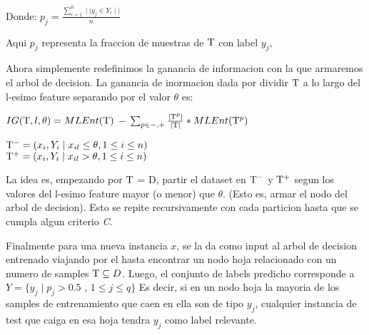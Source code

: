 \documentclass{article}
\begin{document}
            \begin{center}
                Donde: $p_j = \frac {\sum_{i=1}^{n} \mid \mid y_j \in Y_i \mid \mid} {n}$
            \end{center}
            
            Aqui $p_j$ representa la fraccion de muestras de $\mathrm{T}$ con label $y_j$,
            
            Ahora simplemente redefinimos la ganancia de informacion con la que armaremos el arbol de decision. La ganancia de inormacion dada por dividir $\mathrm{T}$ a lo largo del l-esimo feature separando por el valor $\theta$ es:
            
            \begin{center}
                $IG(\mathrm{T}, l, \theta) = MLEnt(\mathrm{T})$ $-$ $\sum_{p \in {-, +}} \frac{\mid \mathrm{T}^p \mid}{\mid \mathrm{T} \mid} * MLEnt(\mathrm{T}^p)$
            \end{center}
            \begin{center}
                $\mathrm{T}^- = {(x_i, Y_i \mid x_{il} \leq \theta, 1 \leq i \leq n)}$ \\
                $\mathrm{T}^+ = {(x_i, Y_i \mid x_{il} > \theta, 1 \leq i \leq n)}$
            \end{center}
        
            La idea es, empezando por $\mathrm{T}$ = D, partir el dataset en $\mathrm{T}^-$ y $\mathrm{T}^+$ segun los valores del l-esimo feature mayor (o menor) que $\theta$. (Esto es, armar el nodo del arbol de decision). Esto se repite recursivamente con cada particion hasta que se cumpla algun criterio \textit{C}.
            
            
            Finalmente para una nueva instancia $x$, se la da como input al arbol de decision entrenado viajando por el hasta encontrar un nodo hoja relacionado con un numero de samples $\mathrm{T} \subseteq D$. Luego, el conjunto de labels predicho corresponde a $Y = \{y_j \mid p_j > 0.5$ , $1 \leq j \leq q\}$
            Es decir, si en un nodo hoja la mayoria de los samples de entrenamiento que caen en ella son de tipo $y_j$, cualquier instancia de test que caiga en esa hoja tendra $y_j$ como label relevante.
            
\end{document}

